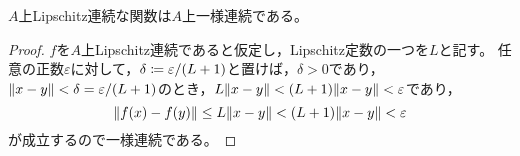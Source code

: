 \documentclass[b5paper,draft,oneside,openany]{ltjsbook} %
\begin{document}
\begin{prop}
    $A$上Lipschitz連続な関数は$A$上一様連続である。
    \begin{proof}
        $f$を$A$上Lipschitz連続であると仮定し，Lipschitz定数の一つを$L$と記す。
        任意の正数$\varepsilon$に対して，$\delta \coloneqq \varepsilon / \pare{L+1}$と置けば，$\delta >0$であり，$\norm{x-y}<\delta = {\varepsilon}/\pare{L+1}$のとき，$L\norm{x-y}<\pare{L+1}\norm{x-y}<\varepsilon$であり，
        \begin{equation}
            \norm{\fun{f}{x} - \fun{f}{y}} \leq L \norm{x - y}<\pare{L+1}\norm{x-y}<\varepsilon
        \end{equation}
        が成立するので一様連続である。
    \end{proof}
\end{prop}
\end{document}
